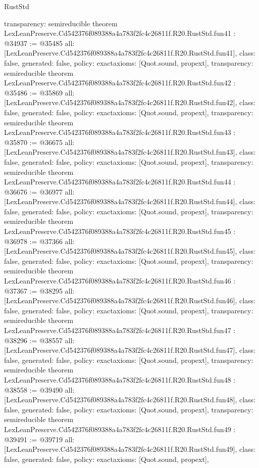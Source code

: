 \begin{lexlean}{RustStd}
\begin{coremodule}
{  transparency: semireducible
}
theorem LexLeanPreserve.Cd542376f089388a4a783f2fc4c26811f.R20.RustStd.fun41 : @34937 := @35485 {
  all: [LexLeanPreserve.Cd542376f089388a4a783f2fc4c26811f.R20.RustStd.fun41],
  class: false,
  generated: false,
  policy: exact{axioms: [Quot.sound, propext]},
  transparency: semireducible
}
theorem LexLeanPreserve.Cd542376f089388a4a783f2fc4c26811f.R20.RustStd.fun42 : @35486 := @35869 {
  all: [LexLeanPreserve.Cd542376f089388a4a783f2fc4c26811f.R20.RustStd.fun42],
  class: false,
  generated: false,
  policy: exact{axioms: [Quot.sound, propext]},
  transparency: semireducible
}
theorem LexLeanPreserve.Cd542376f089388a4a783f2fc4c26811f.R20.RustStd.fun43 : @35870 := @36675 {
  all: [LexLeanPreserve.Cd542376f089388a4a783f2fc4c26811f.R20.RustStd.fun43],
  class: false,
  generated: false,
  policy: exact{axioms: [Quot.sound, propext]},
  transparency: semireducible
}
theorem LexLeanPreserve.Cd542376f089388a4a783f2fc4c26811f.R20.RustStd.fun44 : @36676 := @36977 {
  all: [LexLeanPreserve.Cd542376f089388a4a783f2fc4c26811f.R20.RustStd.fun44],
  class: false,
  generated: false,
  policy: exact{axioms: [Quot.sound, propext]},
  transparency: semireducible
}
theorem LexLeanPreserve.Cd542376f089388a4a783f2fc4c26811f.R20.RustStd.fun45 : @36978 := @37366 {
  all: [LexLeanPreserve.Cd542376f089388a4a783f2fc4c26811f.R20.RustStd.fun45],
  class: false,
  generated: false,
  policy: exact{axioms: [Quot.sound, propext]},
  transparency: semireducible
}
theorem LexLeanPreserve.Cd542376f089388a4a783f2fc4c26811f.R20.RustStd.fun46 : @37367 := @38295 {
  all: [LexLeanPreserve.Cd542376f089388a4a783f2fc4c26811f.R20.RustStd.fun46],
  class: false,
  generated: false,
  policy: exact{axioms: [Quot.sound, propext]},
  transparency: semireducible
}
theorem LexLeanPreserve.Cd542376f089388a4a783f2fc4c26811f.R20.RustStd.fun47 : @38296 := @38557 {
  all: [LexLeanPreserve.Cd542376f089388a4a783f2fc4c26811f.R20.RustStd.fun47],
  class: false,
  generated: false,
  policy: exact{axioms: [Quot.sound, propext]},
  transparency: semireducible
}
theorem LexLeanPreserve.Cd542376f089388a4a783f2fc4c26811f.R20.RustStd.fun48 : @38558 := @39490 {
  all: [LexLeanPreserve.Cd542376f089388a4a783f2fc4c26811f.R20.RustStd.fun48],
  class: false,
  generated: false,
  policy: exact{axioms: [Quot.sound, propext]},
  transparency: semireducible
}
theorem LexLeanPreserve.Cd542376f089388a4a783f2fc4c26811f.R20.RustStd.fun49 : @39491 := @39719 {
  all: [LexLeanPreserve.Cd542376f089388a4a783f2fc4c26811f.R20.RustStd.fun49],
  class: false,
  generated: false,
  policy: exact{axioms: [Quot.sound, propext]},
}
\end{coremodule}
\end{lexlean}
